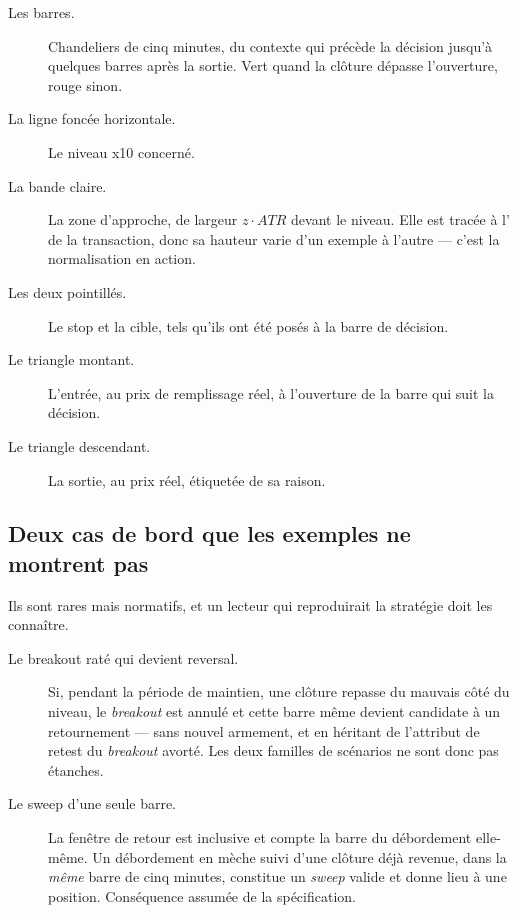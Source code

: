 \begin{description}
  \item[Les barres.] Chandeliers de cinq minutes, du contexte qui précède la
  décision jusqu'à quelques barres après la sortie. Vert quand la clôture
  dépasse l'ouverture, rouge sinon.
  \item[La ligne foncée horizontale.] Le niveau x10 concerné.
  \item[La bande claire.] La zone d'approche, de largeur $z \cdot ATR$ devant
  le niveau. Elle est tracée à l' de la transaction, donc sa hauteur
  varie d'un exemple à l'autre --- c'est la normalisation en action.
  \item[Les deux pointillés.] Le stop et la cible, tels qu'ils ont été posés à
  la barre de décision.
  \item[Le triangle montant.] L'entrée, au prix de remplissage réel, à
  l'ouverture de la barre qui suit la décision.
  \item[Le triangle descendant.] La sortie, au prix réel, étiquetée de sa
  raison.
\end{description}

\subsection{Deux cas de bord que les exemples ne montrent pas}

Ils sont rares mais normatifs, et un lecteur qui reproduirait la stratégie
doit les connaître.

\begin{description}
  \item[Le breakout raté qui devient reversal.] Si, pendant la période de
  maintien, une clôture repasse du mauvais côté du niveau, le \emph{breakout}
  est annulé et cette barre même devient candidate à un retournement --- sans
  nouvel armement, et en héritant de l'attribut de retest du \emph{breakout}
  avorté. Les deux familles de scénarios ne sont donc pas étanches.
  \item[Le sweep d'une seule barre.] La fenêtre de retour est inclusive et
  compte la barre du débordement elle-même. Un débordement en mèche suivi
  d'une clôture déjà revenue, dans la \emph{même} barre de cinq minutes,
  constitue un \emph{sweep} valide et donne lieu à une position. Conséquence
  assumée de la spécification.
\end{description}
